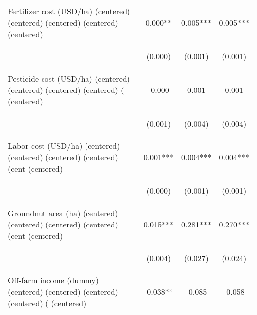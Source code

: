 \begin{center}
\begin{tabular}{lccc}
Fertilizer cost (USD/ha) (centered) (centered) (centered) (centered)  (centered) & 0.000** & 0.005*** & 0.005*** \\
\vspace{4pt} & \begin{footnotesize}(0.000)\end{footnotesize} & \begin{footnotesize}(0.001)\end{footnotesize} & \begin{footnotesize}(0.001)\end{footnotesize} \\
Pesticide cost (USD/ha) (centered) (centered) (centered) (centered) ( (centered) & -0.000 & 0.001 & 0.001 \\
\vspace{4pt} & \begin{footnotesize}(0.001)\end{footnotesize} & \begin{footnotesize}(0.004)\end{footnotesize} & \begin{footnotesize}(0.004)\end{footnotesize} \\
Labor cost (USD/ha) (centered) (centered) (centered) (centered) (cent (centered) & 0.001*** & 0.004*** & 0.004*** \\
\vspace{4pt} & \begin{footnotesize}(0.000)\end{footnotesize} & \begin{footnotesize}(0.001)\end{footnotesize} & \begin{footnotesize}(0.001)\end{footnotesize} \\
Groundnut area (ha) (centered) (centered) (centered) (centered) (cent (centered) & 0.015*** & 0.281*** & 0.270*** \\
\vspace{4pt} & \begin{footnotesize}(0.004)\end{footnotesize} & \begin{footnotesize}(0.027)\end{footnotesize} & \begin{footnotesize}(0.024)\end{footnotesize} \\
Off-farm income (dummy) (centered) (centered) (centered) (centered) ( (centered) & -0.038** & -0.085 & -0.058 \\

\end{tabular}
\end{center}
